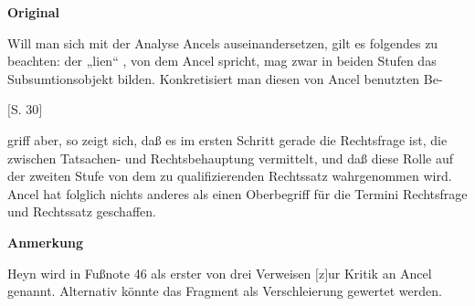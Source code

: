 \documentclass[ngerman,final,fontsize=12pt,paper=a4,twoside,bibliography=totocnumbered,BCOR=8mm,draft=false]{scrartcl}
\newenvironment{fragment}
	{\begin{snugshade}}
	{\end{snugshade}
	 \penalty-200
	 \vskip 0pt plus 10mm minus 5mm}
\newenvironment{fragmentpart}[1]
	{\noindent\textbf{#1}\par\penalty500}
	{\par}
\begin{document}
\begin{fragment}
\begin{fragmentpart}{Original \cite[S.~29--30 Z.~21--30,~1--5]{Heyn-1986}}
{Will man sich mit der Analyse Ancels auseinandersetzen, gilt es folgendes zu
beachten: der „lien“ , von dem Ancel spricht, mag zwar in beiden Stufen das
Subsumtionsobjekt bilden. Konkretisiert man diesen von Ancel benutzten Be-

$[$S. 30$]$

griff aber, so zeigt sich, daß es im ersten Schritt gerade die Rechtsfrage ist, die zwischen Tatsachen- und Rechtsbehauptung vermittelt, und daß diese Rolle auf der zweiten Stufe von dem zu qualifizierenden Rechtssatz wahrgenommen wird. Ancel hat folglich nichts anderes als einen Oberbegriff für die Termini Rechtsfrage und Rechtssatz geschaffen.}
\end{fragmentpart}
\begin{fragmentpart}{Anmerkung}
Heyn wird in Fußnote 46 als erster von drei Verweisen \textquotedbl{}$[$z$]$ur Kritik an Ancel\textquotedbl{} genannt. Alternativ könnte das Fragment als \textquotedbl{}Verschleierung\textquotedbl{} gewertet werden.
\end{fragmentpart}
\end{fragment}
\hypertarget{Lm-Fragment-114-03}{}
\end{document}

